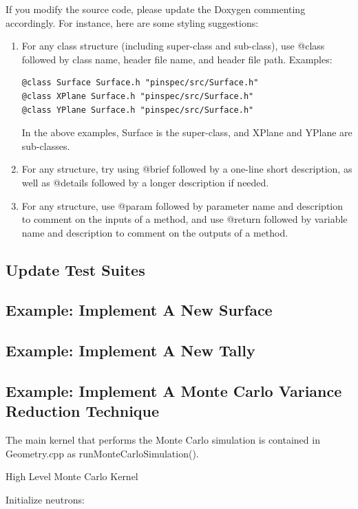 \documentclass[titlepage]{article}
\begin{document}
If you modify the source code, please update the Doxygen commenting accordingly. For instance, here are some styling suggestions:
\begin{enumerate}
\item For any class structure (including super-class and sub-class), use @class followed by class name, header file name, and header file path. Examples:
\begin{verbatim}
@class Surface Surface.h "pinspec/src/Surface.h"
@class XPlane Surface.h "pinspec/src/Surface.h"
@class YPlane Surface.h "pinspec/src/Surface.h"
\end{verbatim}
In the above examples, Surface is the super-class, and XPlane and YPlane are sub-classes. 

\item For any structure, try using @brief followed by a one-line short description, as well as @details followed by a longer description if needed. 

\item For any structure, use @param followed by parameter name and description to comment on the inputs of a method, and use @return followed by variable name and description to comment on the outputs of a method. 
\end{enumerate}


\clearpage
\subsection{Update Test Suites}

\clearpage
\subsection{Example: Implement A New Surface}

\clearpage
\subsection{Example: Implement A New Tally} \label{example-add-tally}


\clearpage
\subsection{Example: Implement A Monte Carlo Variance Reduction Technique}
The main kernel that performs the Monte Carlo simulation is contained in Geometry.cpp as runMonteCarloSimulation(). 

\begin{algorithm}

\caption{High Level Monte Carlo Kernel}
\begin{algorithmic}
\STATE Initialize neutrons:

\ENDFOR
\ENDFOR
\end{algorithmic}
\end{algorithm}
\end{document}
